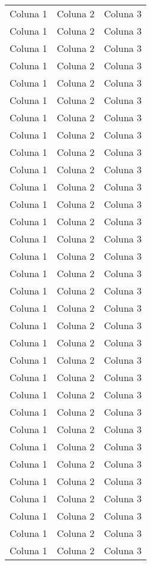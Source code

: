 \documentclass[a4paper,12pt]{article}
\begin{document}
\begin{longtable}[c]{ccc}
		Coluna 1 & Coluna 2 & Coluna 3 \\
		Coluna 1 & Coluna 2 & Coluna 3 \\
		\midrule
		Coluna 1 & Coluna 2 & Coluna 3 \\
		Coluna 1 & Coluna 2 & Coluna 3 \\
		Coluna 1 & Coluna 2 & Coluna 3 \\
		Coluna 1 & Coluna 2 & Coluna 3 \\
		Coluna 1 & Coluna 2 & Coluna 3 \\
		\midrule
		Coluna 1 & Coluna 2 & Coluna 3 \\
		Coluna 1 & Coluna 2 & Coluna 3 \\
		Coluna 1 & Coluna 2 & Coluna 3 \\
		Coluna 1 & Coluna 2 & Coluna 3 \\
		Coluna 1 & Coluna 2 & Coluna 3 \\
		\midrule
		Coluna 1 & Coluna 2 & Coluna 3 \\
		Coluna 1 & Coluna 2 & Coluna 3 \\
		Coluna 1 & Coluna 2 & Coluna 3 \\
		Coluna 1 & Coluna 2 & Coluna 3 \\
		Coluna 1 & Coluna 2 & Coluna 3 \\
		\midrule
		Coluna 1 & Coluna 2 & Coluna 3 \\
		Coluna 1 & Coluna 2 & Coluna 3 \\
		Coluna 1 & Coluna 2 & Coluna 3 \\
		Coluna 1 & Coluna 2 & Coluna 3 \\
		Coluna 1 & Coluna 2 & Coluna 3 \\
		\midrule
		Coluna 1 & Coluna 2 & Coluna 3 \\
		Coluna 1 & Coluna 2 & Coluna 3 \\
		Coluna 1 & Coluna 2 & Coluna 3 \\
		Coluna 1 & Coluna 2 & Coluna 3 \\
		Coluna 1 & Coluna 2 & Coluna 3 \\
		\midrule
		Coluna 1 & Coluna 2 & Coluna 3 \\
		Coluna 1 & Coluna 2 & Coluna 3 \\
		Coluna 1 & Coluna 2 & Coluna 3 \\
		Coluna 1 & Coluna 2 & Coluna 3 \\
		Coluna 1 & Coluna 2 & Coluna 3 \\		
	\end{longtable}
\end{document}

